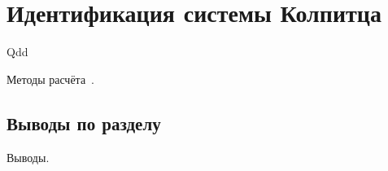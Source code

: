 \chapter{Идентификация системы Колпитца}

Qdd

Методы расчёта~\cite{zaeplnii_radio_calc}.

\section{Выводы по разделу \thechapter}

Выводы.

